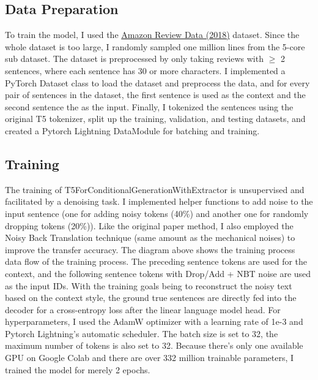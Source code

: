 \documentclass[a2paper]{article}
\begin{document}
\subsection{Data Preparation}
To train the model, I used the \href{https://nijianmo.github.io/amazon/index.html}{Amazon Review Data (2018)} dataset. Since the whole dataset is too large, I randomly sampled one million lines from the 5-core sub dataset. The dataset is preprocessed by only taking reviews with $\ge$ 2 sentences, where each sentence has 30 or more characters. I implemented a PyTorch Dataset class to load the dataset and preprocess the data, and for every pair of sentences in the dataset, the first sentence is used as the context and the second sentence the as the input. Finally, I tokenized the sentences using the original T5 tokenizer, split up the training, validation, and testing datasets, and created a Pytorch Lightning DataModule for batching and training.

\subsection{Training}
The training of T5ForConditionalGenerationWithExtractor is unsupervised and facilitated by a denoising task. I implemented helper functions to add noise to the input sentence (one for adding noisy tokens (40\%) and another one for randomly dropping tokens (20\%)). Like the original paper method, I also employed the Noisy Back Translation technique (same amount as the mechanical noises) to improve the transfer accuracy. The diagram above shows the training process data flow of the training process. The preceding sentence tokens are used for the context, and the following sentence tokens with Drop/Add + NBT noise are used as the input IDs. With the training goals being to reconstruct the noisy text based on the context style, the ground true sentences are directly fed into the decoder for a cross-entropy loss after the linear language model head. For hyperparameters, I used the AdamW optimizer with a learning rate of 1e-3 and Pytorch Lightning's automatic scheduler. The batch size is set to 32, the maximum number of tokens is also set to 32. Because there's only one available GPU on Google Colab and there are over 332 million trainable parameters, I trained the model for merely 2 epochs.
\end{document}
